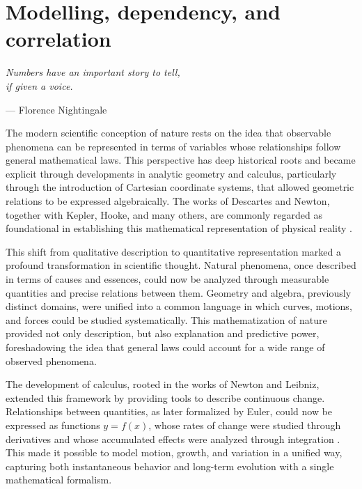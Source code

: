 \chapter{Modelling, dependency, and correlation}
\label{chapter5}

\epigraph{\textit{Numbers have an important story to tell,\\if given a voice.}}{— Florence Nightingale}

The modern scientific conception of nature rests on the idea that observable phenomena can be represented in terms of variables whose relationships follow general mathematical laws. This perspective has deep historical roots and became explicit through developments in analytic geometry and calculus, particularly through the introduction of Cartesian coordinate systems, that allowed geometric relations to be expressed algebraically. The works of Descartes and Newton, together with Kepler, Hooke, and many others, are commonly regarded as foundational in establishing this mathematical representation of physical reality \cite{descartes_1637_geometry,newton_1687_principia}. 

\medskip

This shift from qualitative description to quantitative representation marked a profound transformation in scientific thought. Natural phenomena, once described in terms of causes and essences, could now be analyzed through measurable quantities and precise relations between them. Geometry and algebra, previously distinct domains, were unified into a common language in which curves, motions, and forces could be studied systematically. This mathematization of nature provided not only description, but also explanation and predictive power, foreshadowing the idea that general laws could account for a wide range of observed phenomena.

\medskip

The development of calculus, rooted in the works of Newton and Leibniz, extended this framework by providing tools to describe continuous change. Relationships between quantities, as later formalized by Euler, could now be expressed as functions \( y = f(x) \), whose rates of change were studied through derivatives and whose accumulated effects were analyzed through integration \cite{leibniz_1684_nova,cauchy_1821_analyse}. This made it possible to model motion, growth, and variation in a unified way, capturing both instantaneous behavior and long-term evolution with a single mathematical formalism.


